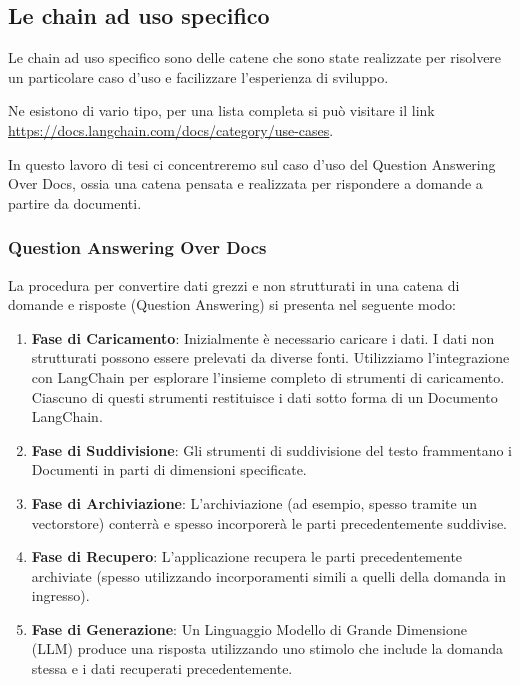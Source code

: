 \subsection[Chain specifiche]{Le chain ad uso specifico}

Le chain ad uso specifico sono delle catene che sono state realizzate per risolvere un particolare caso d'uso e facilizzare l'esperienza di sviluppo.

Ne esistono di vario tipo, per una lista completa si può visitare il link \url{https://docs.langchain.com/docs/category/use-cases}.

In questo lavoro di tesi ci concentreremo sul caso d'uso del Question Answering Over Docs, ossia una catena pensata e realizzata per rispondere a domande a partire da documenti.

\subsubsection[QA Over Docs]{Question Answering Over Docs}

La procedura per convertire dati grezzi e non strutturati in una catena di domande e risposte (Question Answering) si presenta nel seguente modo:

\begin{enumerate}
    \item \textbf{Fase di Caricamento}: Inizialmente è necessario caricare i dati. I dati non strutturati possono essere prelevati da diverse fonti. Utilizziamo l'integrazione con LangChain per esplorare l'insieme completo di strumenti di caricamento. Ciascuno di questi strumenti restituisce i dati sotto forma di un Documento LangChain.
    \item \textbf{Fase di Suddivisione}: Gli strumenti di suddivisione del testo frammentano i Documenti in parti di dimensioni specificate.
    \item \textbf{Fase di Archiviazione}: L'archiviazione (ad esempio, spesso tramite un vectorstore) conterrà e spesso incorporerà le parti precedentemente suddivise.
    \item \textbf{Fase di Recupero}: L'applicazione recupera le parti precedentemente archiviate (spesso utilizzando incorporamenti simili a quelli della domanda in ingresso).
    \item \textbf{Fase di Generazione}: Un Linguaggio Modello di Grande Dimensione (LLM) produce una risposta utilizzando uno stimolo che include la domanda stessa e i dati recuperati precedentemente.
\end{enumerate}

